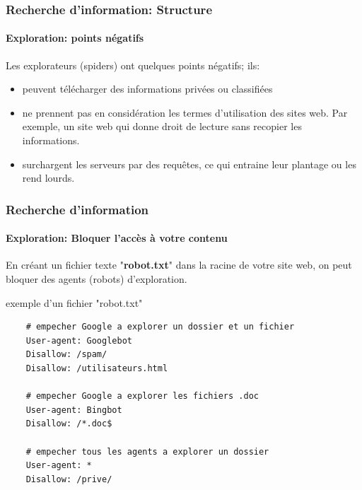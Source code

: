 \documentclass[xcolor=table]{beamer}
\begin{document}
\begin{frame}
\frametitle{Recherche d'information: Structure}
\framesubtitle{Exploration: points négatifs}

Les explorateurs (spiders) ont quelques points négatifs; ils:
\begin{itemize}
	\item peuvent télécharger des informations privées ou classifiées
	\item ne prennent pas en considération les termes d'utilisation des sites web. 
	Par exemple, un site web qui donne droit de lecture sans recopier les informations. 
	\item surchargent les serveurs par des requêtes, ce qui entraine leur plantage ou les rend lourds.
\end{itemize}

\end{frame}

\begin{frame}[fragile]
\frametitle{Recherche d'information}
\framesubtitle{Exploration: Bloquer l'accès à votre contenu}


En créant un fichier texte "\textbf{robot.txt}" dans la racine de votre site web, on peut bloquer des agents (robots) d'exploration.

%	

\begin{exampleblock}{exemple d'un fichier "robot.txt"}
	\scriptsize\bfseries
	\begin{lstlisting}
	# empecher Google a explorer un dossier et un fichier
	User-agent: Googlebot
	Disallow: /spam/ 
	Disallow: /utilisateurs.html
	
	# empecher Google a explorer les fichiers .doc 
	User-agent: Bingbot
	Disallow: /*.doc$ 
	
	# empecher tous les agents a explorer un dossier
	User-agent: *
	Disallow: /prive/
	\end{lstlisting}
\end{exampleblock}


\end{frame}
\end{document}
